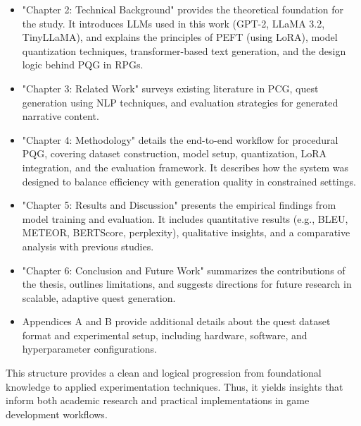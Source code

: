 \begin{itemize}
  \item {"Chapter 2: Technical Background" provides the theoretical foundation for the
        study. It introduces LLMs used in this work (GPT-2, LLaMA 3.2, TinyLLaMA),
        and explains the principles of PEFT (using LoRA), model quantization techniques,
        transformer-based text generation, and the design logic behind PQG in RPGs.}
  \item {"Chapter 3: Related Work" surveys existing literature in PCG, quest generation
        using NLP techniques, and evaluation strategies for generated narrative content.}
  \item {"Chapter 4: Methodology" details the end-to-end workflow for procedural PQG,
        covering dataset construction, model setup, quantization, LoRA integration, and
        the evaluation framework. It describes how the system was designed to balance
        efficiency with generation quality in constrained settings.}
  \item {"Chapter 5: Results and Discussion" presents the empirical findings from model
        training and evaluation. It includes quantitative results (e.g., BLEU, METEOR,
        BERTScore, perplexity), qualitative insights, and a comparative analysis with previous
        studies.}
  \item {"Chapter 6: Conclusion and Future Work" summarizes the contributions of the
        thesis, outlines limitations, and suggests directions for future research in scalable,
        adaptive quest generation.}
  \item {Appendices A and B provide additional details about the quest dataset format and
        experimental setup, including hardware, software, and hyperparameter configurations.}
\end{itemize}

This structure provides a clean and logical progression from foundational knowledge
to applied experimentation techniques. Thus, it yields insights that inform both academic
research and practical implementations in game development workflows.

\newpage

